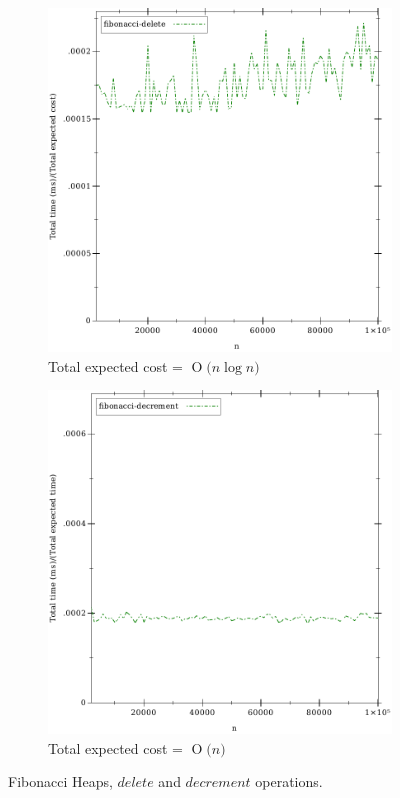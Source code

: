 \documentclass{llncs}
\newcommand{\BigO}[1]{\ensuremath{\operatorname{O}\bigl(#1\bigr)}}
\begin{document}
\begin{figure}
	\begin{subfigure}{0.5\textwidth}
		\centering
		\includegraphics[width=0.8\linewidth]{FIG/fi_delete.pdf}
		\caption{Total expected cost = \BigO{n \log n}} 
		\label{fig:fi_delete}
	\end{subfigure}%
	\begin{subfigure}{0.5\textwidth}
		\centering
		\includegraphics[width=0.8\linewidth]{FIG/fi_decrement.pdf}
		\caption{Total expected cost = \BigO{n}}
		\label{fig:fi_decrement}
	\end{subfigure}
	\caption{Fibonacci Heaps, $delete$ and $decrement$ operations.}
	\label{fig:fi_delete_decrement}
\end{figure}
\end{document}
